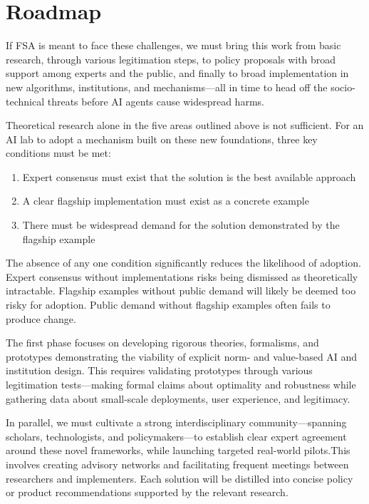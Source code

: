 \section{Roadmap}
If FSA is meant to face these challenges, we must bring this work from basic research, through various legitimation steps, to policy proposals with broad support among experts and the public, and finally to broad implementation in new algorithms, institutions, and mechanisms—all in time to head off the socio-technical threats before AI agents cause widespread harms.

Theoretical research alone in the five areas outlined above is not sufficient. For an AI lab to adopt a mechanism built on these new foundations, three key conditions must be met:

\begin{enumerate}
\item Expert consensus must exist that the solution is the best available approach
\item A clear flagship implementation must exist as a concrete example
\item There must be widespread demand for the solution demonstrated by the flagship example
\end{enumerate}

The absence of any one condition significantly reduces the likelihood of adoption. Expert consensus without implementations risks being dismissed as theoretically intractable. Flagship examples without public demand will likely be deemed too risky for adoption. Public demand without flagship examples often fails to produce change.

The first phase focuses on developing rigorous theories, formalisms, and prototypes demonstrating the viability of explicit norm- and value-based AI and institution design. This requires validating prototypes through various legitimation tests—making formal claims about optimality and robustness while gathering data about small-scale deployments, user experience, and legitimacy.

In parallel, we must cultivate a strong interdisciplinary community—spanning scholars, technologists, and policymakers—to establish clear expert agreement around these novel frameworks, while launching targeted real-world pilots.This involves creating advisory networks and facilitating frequent meetings between researchers and implementers. Each solution will be distilled into concise policy or product recommendations supported by the relevant research.

